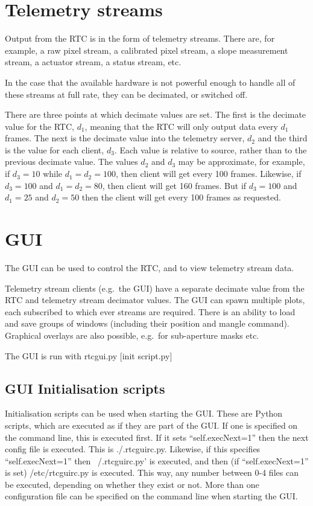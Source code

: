 \documentclass[a4,10pt]{article}
\begin{document}
\section{Telemetry streams}
Output from the RTC is in the form of telemetry streams.  There are,
for example, a raw pixel stream, a calibrated pixel stream, a slope
measurement stream, a actuator stream, a status stream, etc.

In the case that the available hardware is not powerful enough to
handle all of these streams at full rate, they can be decimated, or
switched off.

There are three points at which decimate values are set.  The first is
the decimate value for the RTC, $d_1$, meaning that the RTC will only
output data every $d_1$ frames.  The next is the decimate value into
the telemetry server, $d_2$ and the third is the value for each
client, $d_3$.  Each value is relative to source, rather than to the
previous decimate value.  The values $d_2$ and $d_3$ may be approximate, for
example, if $d_3=10$ while $d_1=d_2=100$, then client will get every
100 frames.
Likewise, if $d_3=100$ and $d_1=d_2=80$, then client will get
160 frames.  But if $d_3=100$ and $d_1=25$ and $d_2=50$ then the
client will get every 100 frames as requested.

\section{GUI}
The GUI can be used to control the RTC, and to view telemetry stream data.

Telemetry stream clients (e.g.\ the GUI) have a separate decimate
value from the RTC and telemetry stream decimator values.  The GUI can
spawn multiple plots, each subscribed to which ever streams are
required.  There is an ability to load and save groups of windows
(including their position and mangle command).  Graphical overlays are
also possible, e.g.\ for sub-aperture masks etc.

The GUI is run with rtcgui.py [init script.py]

\subsection{GUI Initialisation scripts}
Initialisation scripts can be used when starting the GUI.  These are
Python scripts, which are executed as if they are part of the GUI.  If
one is specified on the command line, this is executed first.  If it
sets ``self.execNext=1'' then the next config file is executed.  This
is ./.rtcguirc.py.  Likewise, if this specifies ``self.execNext=1''
then ~/.rtcguirc.py' is executed, and then (if ``self.execNext=1'' is
set) /etc/rtcguirc.py is executed.  This way, any number between 0-4
files can be executed, depending on whether they exist or not.  More
than one configuration file can be specified on the command line when
starting the GUI.
\end{document}
